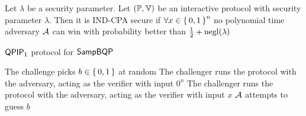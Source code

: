 \begin{dfn}
	Let $\lambda$ be a security parameter.
	Let $(\mathbb{P}, \mathbb{V})$ be an interactive protocol with security parameter $\lambda$.
	Then it is IND-CPA secure if $\forall x\in\set{0,1}^n$ no polynomial time adversary $\mathcal{A}$ can win  with probability better than $\frac{1}{2}+\operatorname{negl}(\lambda)$
\end{dfn}

\begin{algorithm}
	\caption{ $\operatorname{\mathsf{QPIP}}_1$ protocol for $\operatorname{\mathsf{SampBQP}}$}
	\label{ProtoIndCPA}
	\begin{algorithmic}[1]
		\State The challenge picks $b\in\set{0,1}$ at random
			\State The challenger runs the protocol with the adversary, acting as the verifier with input $0^n$
		\Else
			\State The challenger runs the protocol with the adversary, acting as the verifier with input $x$
		\EndIf
		\State $\mathcal{A}$ attempts to guess $b$
	\end{algorithmic}
\end{algorithm}
